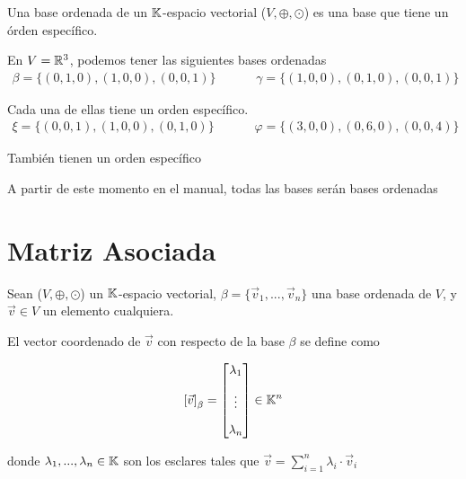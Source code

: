 \begin{definition}
    Una base ordenada de un $\mathbb{K}$-espacio vectorial ($V, \oplus, \odot$) es una base que tiene un órden específico.
\end{definition}

\begin{eg}
    En $V = \mathbb{R}^3$, podemos tener las siguientes bases ordenadas
    \begin{align*}
       \beta = \{ (0,1,0), (1,0,0), (0,0,1) \} && && \gamma = \{ (1,0,0), (0,1,0), (0,0,1) \}
    \end{align*}

    Cada una de ellas tiene un orden específico.
    \begin{align*}
       \xi = \{ (0,0,1), (1,0,0), (0,1,0) \} && && \varphi = \{ (3,0,0), (0,6,0), (0,0,4) \}
    \end{align*}

    También tienen un orden específico
\end{eg}

\begin{notation}
    A partir de este momento en el manual, todas las bases serán bases ordenadas
\end{notation}

\section{Matriz Asociada}

\begin{definition}
    Sean ($V, \oplus, \odot$) un $\mathbb{K}$-espacio vectorial, $\beta =  \{ \vec{v}_{1}, ..., \vec{v}_{n} \}$ una base ordenada de $V$, y $\vec{v} \in V$ un elemento cualquiera.

    El vector coordenado de $\vec{v}$ con respecto de la base $\beta$ se define como

    $${\left[\vec{v} \right]}_{\beta} = \begin{bmatrix}
\lambda_1 \\[2ex]
\vdots\\[2ex]
\lambda_n
\end{bmatrix} \in \mathbb{K}^n$$

donde $\lambda_1, ..., \lambda_n \in \mathbb{K}$ son los esclares tales que $\vec{v} = \sum_{i=1}^{n} \lambda_i \cdot \vec{v}_i $
\end{definition}


